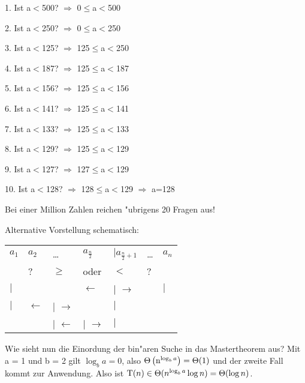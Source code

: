 \documentclass[draft,12pt]{scrreprt}
\theoremstyle{break}
\begin{document}
1. Ist a$<$500? $\Rightarrow$ 0$\leq$a$<$500

2. Ist a$<$250? $\Rightarrow$ 0$\leq$a$<$250

3. Ist a$<$125? $\Rightarrow$ 125$\leq$a$<$250

4. Ist a$<$187? $\Rightarrow$ 125$\leq$a$<$187

5. Ist a$<$156? $\Rightarrow$ 125$\leq$a$<$156

6. Ist a$<$141? $\Rightarrow$ 125$\leq$a$<$141

7. Ist a$<$133? $\Rightarrow$ 125$\leq$a$<$133

8. Ist a$<$129? $\Rightarrow$ 125$\leq$a$<$129

9. Ist a$<$127? $\Rightarrow$ 127$\leq$a$<$129

10. Ist a$<$128? $\Rightarrow$ 128$\leq$a$<$129 $\Rightarrow$ a=128 

Bei einer Million Zahlen reichen "ubrigens 20 Fragen aus!
\bigskip

% 
Alternative Vorstellung schematisch:

\begin{tabular}{lllllll}
$a_1$     & $a_2$           & \dots   &  \( a_{\frac{n}{2}}\) & \( \vert a_{\frac{n}{2}+1}\) & \dots  & $a_n$ \\
          &       ?         & $\geq$  & oder                  & $<$                          &  ?     &\\
$\vert$   &                 &         & $\gets$               & $\vert$ $\to$                &        & $\vert$\\
$\vert$   & $\gets$ & $\vert$ $\to$ & & $\vert$\\
&         & $\vert$ $\gets$ & $\vert$ $\to$ & $\vert$
\end{tabular}
\bigskip

Wie sieht nun die Einordung der bin"aren Suche in das Mastertheorem aus?
Mit a = 1 und b = 2 gilt \(\log_ba = 0\), also \(\Theta\left(\textup{n}^{\log_ba}\right)=\Theta(1)\) und der zweite Fall kommt zur Anwendung.
Also ist \(  \textup{T}(n) \in \Theta(n^{\log_ba}\log n)=\Theta(\log n) \).
\end{document}
